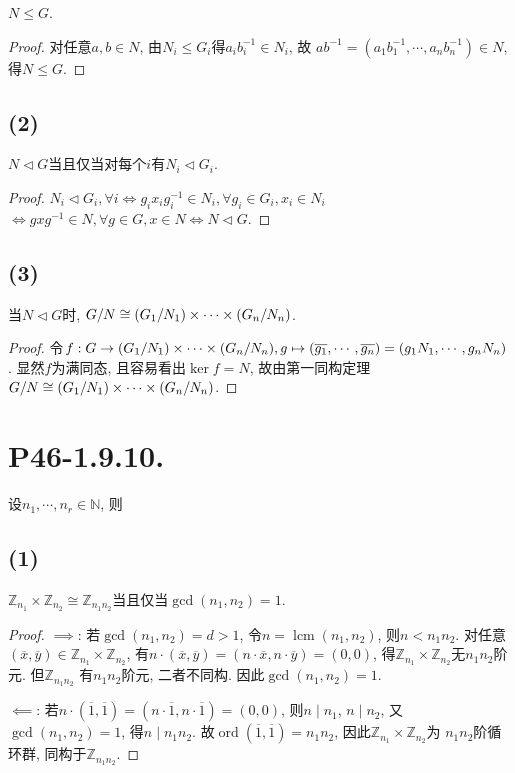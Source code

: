 \documentclass[12pt, a4paper, fontset=windows]{ctexart}
\newcommand{\N}{\mathbb{N}}
\newcommand{\Z}{\mathbb{Z}}
\newcommand{\cl}[1]{\overline{#1}} %
\newcommand{\isom}{\cong} %
\newcommand{\lcm}{\operatorname{lcm}}
\newcommand{\ord}{\operatorname{ord}}
\begin{document}
{$N\le G$. 

\begin{proof}
对任意$a,b\in N$, 由$N_i\le G_i$得$a_ib_i^{-1}\in N_i$, 故
$ab^{-1}=(a_1b_1^{-1},\cdots,a_nb_n^{-1})\in N$, 得$N\le G$. 
\end{proof}

\subsection*{(2)}

$N\lhd G$当且仅当对每个$i$有$N_i\lhd G_i$. 

\begin{proof}
$N_i\lhd G_i,\forall i\iff g_ix_ig_i^{-1}\in N_i,
\forall g_i\in G_i,x_i\in N_i$
$\iff gxg^{-1}\in N,\forall g\in G,x\in N\iff N\lhd G$. 
\end{proof}

\subsection*{(3)}

当$N\lhd G$时, $G/N\isom(G_1/N_1)\timess(G_n/N_n)$. 

\begin{proof}
令$f:G\to (G_1/N_1)\timess(G_n/N_n),g\mapsto(\cl{g_1},\cdots,\cl{g_n})=(g_1N_1,\cdots,g_nN_n)$. 
显然$f$为满同态, 且容易看出$\ker f=N$, 故由第一同构定理
$G/N\isom(G_1/N_1)\timess(G_n/N_n)$. 
\end{proof}

\section*{P46-1.9.10.}

设$n_1,\cdots,n_r\in\N$, 则

\subsection*{(1)}

$\Z_{n_1}\times\Z_{n_2}\isom\Z_{n_1n_2}$当且仅当$\gcd(n_1,n_2)=1$. 

\begin{proof}
$\implies$: 若$\gcd(n_1,n_2)=d>1$, 令$n=\lcm(n_1,n_2)$, 则$n<n_1n_2$. 
对任意$(\cl{x},\cl{y})\in\Z_{n_1}\times\Z_{n_2}$, 
有$n\cdot(\cl{x},\cl{y})=(n\cdot\cl{x},n\cdot\cl{y})=(0,0)$, 
得$\Z_{n_1}\times\Z_{n_2}$无$n_1n_2$阶元. 但$\Z_{n_1n_2}$
有$n_1n_2$阶元, 二者不同构. 因此$\gcd(n_1,n_2)=1$. 

$\impliedby$: 若$n\cdot(\cl{1},\cl{1})=(n\cdot\cl{1},n\cdot\cl{1})=(0,0)$, 
则$n\mid n_1$, $n\mid n_2$, 又$\gcd(n_1,n_2)=1$, 得$n\mid n_1n_2$. 
故$\ord(\cl{1},\cl{1})=n_1n_2$, 因此$\Z_{n_1}\times\Z_{n_2}$为
$n_1n_2$阶循环群, 同构于$\Z_{n_1n_2}$. 
\end{proof}

}
\end{document}
